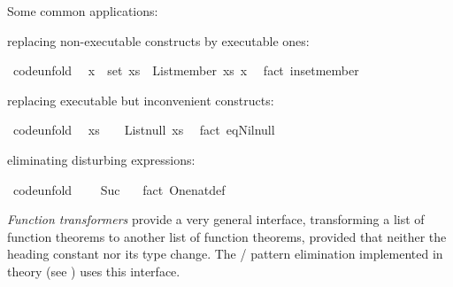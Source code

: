 \begin{isabellebody}
\begin{isamarkuptext}
  Some common applications:%
\end{isamarkuptext}%
\isamarkuptrue%
%
\begin{itemize}
%
\begin{isamarkuptext}%
\item replacing non-executable constructs by executable ones:%
\end{isamarkuptext}%
\isamarkuptrue%
%
\isadelimquote
%
\endisadelimquote
%
\isatagquote
{}\isamarkupfalse%
\ {\isacharbrackleft}code{\isacharunderscore}unfold{\isacharbrackright}{\isacharcolon}\isanewline
\ \ {\isachardoublequoteopen}x\ {\isasymin}\ set\ xs\ {\isasymlongleftrightarrow}\ List{\isachardot}member\ xs\ x{\isachardoublequoteclose}\ \isamarkupfalse%
\ {\isacharparenleft}fact\ in{\isacharunderscore}set{\isacharunderscore}member{\isacharparenright}%
\endisatagquote
{\isafoldquote}%
%
\isadelimquote
%
\endisadelimquote
%
\begin{isamarkuptext}%
\item replacing executable but inconvenient constructs:%
\end{isamarkuptext}%
\isamarkuptrue%
%
\isadelimquote
%
\endisadelimquote
%
\isatagquote
{}\isamarkupfalse%
\ {\isacharbrackleft}code{\isacharunderscore}unfold{\isacharbrackright}{\isacharcolon}\isanewline
\ \ {\isachardoublequoteopen}xs\ {\isacharequal}\ {\isacharbrackleft}{\isacharbrackright}\ {\isasymlongleftrightarrow}\ List{\isachardot}null\ xs{\isachardoublequoteclose}\ \isamarkupfalse%
\ {\isacharparenleft}fact\ eq{\isacharunderscore}Nil{\isacharunderscore}null{\isacharparenright}%
\endisatagquote
{\isafoldquote}%
%
\isadelimquote
%
\endisadelimquote
%
\begin{isamarkuptext}%
\item eliminating disturbing expressions:%
\end{isamarkuptext}%
\isamarkuptrue%
%
\isadelimquote
%
\endisadelimquote
%
\isatagquote
{}\isamarkupfalse%
\ {\isacharbrackleft}code{\isacharunderscore}unfold{\isacharbrackright}{\isacharcolon}\isanewline
\ \ {\isachardoublequoteopen}{}\ {\isacharequal}\ Suc\ {}{\isachardoublequoteclose}\ \isamarkupfalse%
\ {\isacharparenleft}fact\ One{\isacharunderscore}nat{\isacharunderscore}def{\isacharparenright}%
\endisatagquote
{\isafoldquote}%
%
\isadelimquote
%
\endisadelimquote
%
\end{itemize}
%
\begin{isamarkuptext}%
\noindent \emph{Function transformers} provide a very general
  interface, transforming a list of function theorems to another list
  of function theorems, provided that neither the heading constant nor
  its type change.  The  /  pattern
  elimination implemented in theory \hyperlink{theory.Efficient-Nat}{\mbox{}} (see
  ) uses this interface.


\end{isamarkuptext}
\end{isabellebody}
